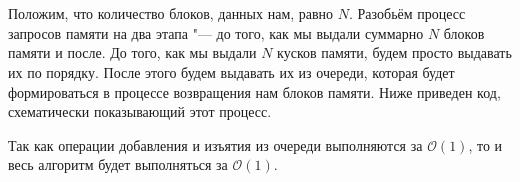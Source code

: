 \section{}
	Положим, что количество блоков, данных нам, равно $N$. Разобьём процесс запросов памяти на два этапа "--- до того, как мы выдали суммарно $N$ блоков памяти и после. До того, как мы выдали $N$ кусков памяти, будем просто выдавать их по порядку. После этого будем выдавать их из очереди, которая будет формироваться в процессе возвращения нам блоков памяти. Ниже приведен код, схематически показывающий этот процесс.
	
	Так как операции добавления и изъятия из очереди выполняются за $\mathcal{O}(1)$, то и весь алгоритм будет выполняться за $\mathcal{O}(1)$.
	
	